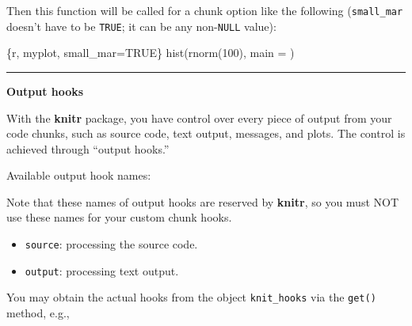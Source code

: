 \documentclass[
  a4paper,
  twoside,
  openright]{book}
\newenvironment{Shaded}{\begin{snugshade}}{\end{snugshade}}
\newcommand{\AttributeTok}[1]{\textcolor[rgb]{0.13,0.29,0.53}{#1}}
\newcommand{\CommentTok}[1]{\textcolor[rgb]{0.56,0.35,0.01}{\textit{#1}}}
\newcommand{\FunctionTok}[1]{\textcolor[rgb]{0.13,0.29,0.53}{\textbf{#1}}}
\newcommand{\NormalTok}[1]{#1}
\newcommand{\SpecialCharTok}[1]{\textcolor[rgb]{0.81,0.36,0.00}{\textbf{#1}}}
\newcommand{\StringTok}[1]{\textcolor[rgb]{0.31,0.60,0.02}{#1}}
\providecommand{\tightlist}{%
  \setlength{\itemsep}{0pt}\setlength{\parskip}{0pt}}
\theoremstyle{definition}
\theoremstyle{definition}
\theoremstyle{definition}
\theoremstyle{definition}
\theoremstyle{remark}
\begin{document}
Then this function will be called for a chunk option like the following (\texttt{small\_mar} doesn't have to be \texttt{TRUE}; it can be any non-\texttt{NULL} value):

\begin{Shaded}
\begin{Highlighting}[]
\StringTok{\textasciigrave{}\textasciigrave{}\textasciigrave{}}\AttributeTok{\{r, myplot, small\_mar=TRUE\}}
\AttributeTok{hist(rnorm(100), main = \textquotesingle{}\textquotesingle{})}
\StringTok{\textasciigrave{}\textasciigrave{}\textasciigrave{}}
\end{Highlighting}
\end{Shaded}

\begin{center}\rule{0.5\linewidth}{0.5pt}\end{center}

\textbf{Output hooks}

With the \textbf{knitr} package, you have control over every piece of output from your code chunks, such as source code, text output, messages, and plots. The control is achieved through ``output hooks.''

Available output hook names:

Note that these names of output hooks are reserved by \textbf{knitr}, so you must NOT use these names for your custom chunk hooks.

\begin{itemize}
\tightlist
\item
  \texttt{source}: processing the source code.
\item
  \texttt{output}: processing text output.
\end{itemize}

You may obtain the actual hooks from the object \texttt{knit\_hooks} via the \texttt{get()} method, e.g.,

\begin{Shaded}
\end{Shaded}
\end{document}
